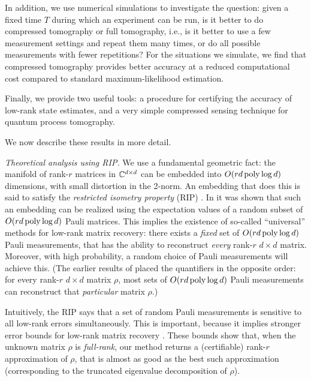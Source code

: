 In addition, we use numerical simulations to investigate the question: given a fixed time $T$ during which an experiment can be run, is it better to do compressed tomography or full tomography, i.e., is it better to use a few measurement settings and repeat them many times, or do all possible measurements with fewer repetitions?  For the situations we simulate, we find that compressed tomography provides better accuracy at a reduced computational cost compared to standard maximum-likelihood estimation.

Finally, we provide two useful tools:  a procedure for certifying the accuracy of low-rank state estimates, and a very simple compressed sensing technique for quantum process tomography.

We now describe these results in more detail.

\textit{Theoretical analysis using RIP.} 
We use a fundamental geometric fact:  the manifold of rank-$r$ matrices in $\mathbb{C}^{d\times d}$ can be embedded into $O(rd\operatorname{poly}\log d)$ dimensions, with small distortion in the 2-norm.  An embedding that does this is said to satisfy the \textit{restricted isometry property} (RIP) \cite{Recht2007}.  In \cite{Liu2011} it was shown that such an embedding can be realized using the expectation values of a random subset of $O(rd\operatorname{poly}\log d)$ Pauli matrices.  This implies the existence of so-called ``universal'' methods for low-rank matrix recovery:  there exists a \textit{fixed} set of $O(rd\operatorname{poly}\log d)$ Pauli measurements, that has the ability to reconstruct \textit{every} rank-$r$ $d\times d$ matrix.  Moreover, with high probability, a random choice of Pauli measurements will achieve this.  (The earlier results of \cite{Gross2010} placed the quantifiers in the opposite order:  for every rank-$r$ $d\times d$ matrix $\rho$, most sets of $O(rd\operatorname{poly}\log d)$ Pauli measurements can reconstruct that \textit{particular} matrix $\rho$.)

Intuitively, the RIP says that a set of random Pauli measurements is sensitive to all low-rank errors simultaneously. This is important, because it implies stronger error bounds for low-rank matrix recovery \cite{Candes2011}. These bounds show that, when the unknown matrix $\rho$ is \textit{full-rank}, our method returns a (certifiable) rank-$r$ approximation of $\rho$, that is almost as good as the best such approximation (corresponding to the truncated eigenvalue decomposition of $\rho$). 

